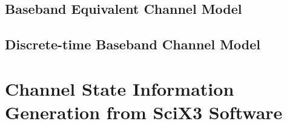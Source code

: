 \documentclass[letterpaper,11pt]{article}
\begin{document}
\subsection{Baseband Equivalent Channel Model}

\subsection{Discrete-time Baseband Channel Model}

\section{Channel State Information Generation from SciX3 Software}



\end{document}
